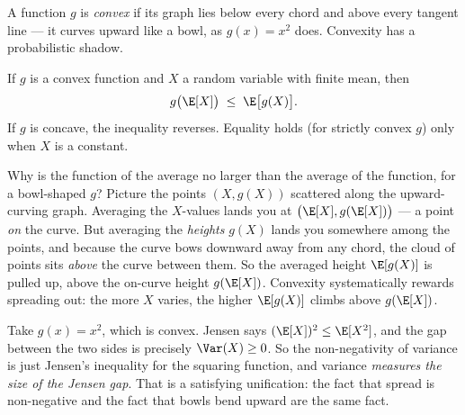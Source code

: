 A function $g$ is \emph{convex} if its graph lies below every chord and above
every tangent line --- it curves upward like a bowl, as $g(x) = x^2$ does.
Convexity has a probabilistic shadow.

\begin{theorem}
\label{ch09:thm-jensen}
If $g$ is a convex function and $X$ a random variable with finite mean, then
\[
  g\big(\E[X]\big) \;\le\; \E\big[g(X)\big].
\]
If $g$ is concave, the inequality reverses. Equality holds (for strictly
convex $g$) only when $X$ is a constant.
\end{theorem}

\begin{whybox}
Why is the function of the average no larger than the average of the function,
for a bowl-shaped $g$? Picture the points $(X, g(X))$ scattered along the
upward-curving graph. Averaging the $X$-values lands you at
$\big(\E[X], g(\E[X])\big)$ --- a point \emph{on} the curve. But averaging the
\emph{heights} $g(X)$ lands you somewhere among the points, and because the
curve bows downward away from any chord, the cloud of points sits \emph{above}
the curve between them. So the averaged height $\E[g(X)]$ is pulled up, above
the on-curve height $g(\E[X])$. Convexity systematically rewards spreading
out: the more $X$ varies, the higher $\E[g(X)]$ climbs above $g(\E[X])$.
\end{whybox}

Take $g(x) = x^2$, which is convex. Jensen says
$(\E[X])^2 \le \E[X^2]$, and the gap between the two sides is precisely
$\Var(X) \ge 0$. So the non-negativity of variance is just Jensen's
inequality for the squaring function, and variance \emph{measures the size of
the Jensen gap}. That is a satisfying unification: the fact that spread is
non-negative and the fact that bowls bend upward are the same fact.

